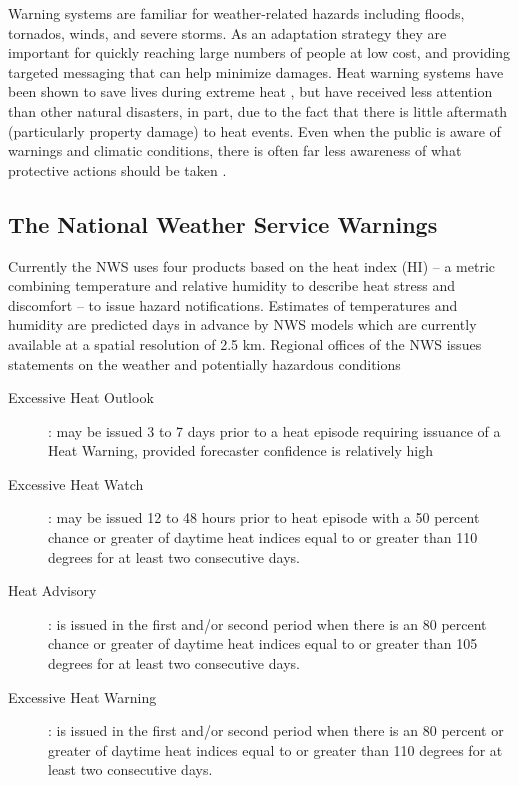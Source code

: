 \documentclass[twocol]{ametsoc}
\begin{document}
Warning systems are familiar for weather-related hazards including floods, tornados, winds, and severe storms. As an adaptation strategy they are important for quickly reaching large numbers of people at low cost, and providing targeted messaging that can help minimize damages. Heat warning systems have been shown to save lives during extreme heat \citep{Ebi2004}, but have received less attention than other natural disasters, in part, due to the fact that there is little aftermath (particularly property damage) to heat events. Even when the public is aware of warnings and climatic conditions, there is often far less awareness of what protective actions should be taken \citep{Sheridan2007}.  

\subsection{The National Weather Service Warnings} \label{subsection:NWSWarnings}
Currently the NWS uses four products based on the heat index (HI) -- a metric combining temperature and relative humidity to describe heat stress and discomfort -- to issue hazard notifications. Estimates of temperatures and humidity are predicted days in advance by NWS models which are currently available at a spatial resolution of 2.5 km. Regional offices of the NWS issues statements on the weather and potentially hazardous conditions 

\begin{description} 
\item[Excessive Heat Outlook]: may be issued 3 to 7 days prior to a heat episode requiring issuance of a Heat Warning, provided forecaster confidence is relatively high 
\item[Excessive Heat Watch]: may be issued 12 to 48 hours prior to heat episode with a 50 percent chance or greater of daytime heat indices equal to or greater than 110 degrees for at least two consecutive days. 
\item[Heat Advisory]: is issued in the first and/or second period when there is an 80 percent chance or greater of daytime heat indices equal to or greater than 105 degrees for at least two consecutive days. 
\item[Excessive Heat Warning]: is issued in the first and/or second period when there is an 80 percent or greater of daytime heat indices equal to or greater than 110 degrees for at least two consecutive days. 
\end{description}
\end{document}

